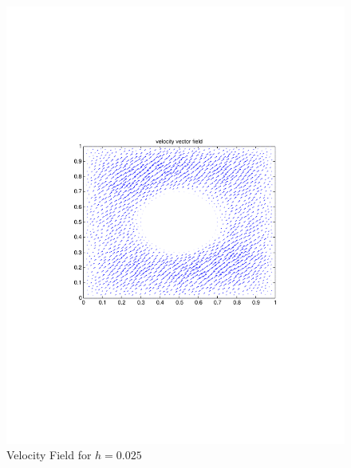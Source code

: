 \documentclass[12pt]{article}
\begin{document}
                \begin{figure}[htb]
                    \begin{center}
                \includegraphics[scale=0.50]{./../files/box-circle/q.pdf}
                \caption{Velocity Field  for $h = 0.025$}
            \end{center}
            \end{figure}
\end{document}
